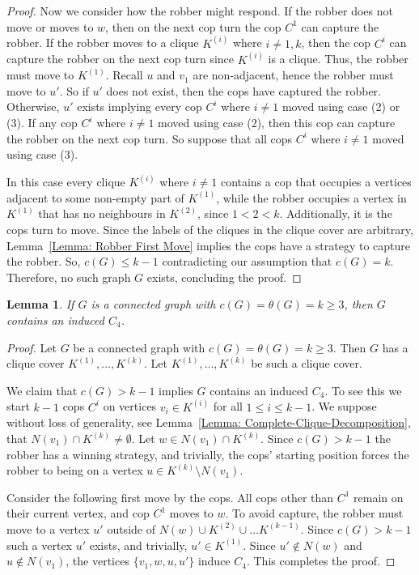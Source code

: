 \documentclass[12pt]{amsart}
\newtheorem{lemma}[theorem]{Lemma}
\theoremstyle{definition}
\begin{document}
\begin{proof}
    Now we consider how the robber might respond. If the robber does not move or moves to $w$, then on the next cop turn the cop $C^{1}$ can capture the robber.
    If the robber moves to a clique $K^{(i)}$ where $i\neq 1,k$, then the cop $C^{i}$ can capture the robber on the next cop turn since $K^{(i)}$ is a clique.
    Thus, the robber must move to $K^{(1)}$.
    Recall $u$ and $v_1$ are non-adjacent,
    hence the robber must move to $u'$.
    So if $u'$ does not exist, then the cops have captured the robber.
    Otherwise, $u'$ exists implying every cop $C^{i}$ where $i\neq 1$ moved using case (2) or (3).
    If any cop $C^{i}$ where $i\neq 1$ moved using case (2), then this cop can capture the robber on the next cop turn.
    So suppose that all cops $C^{i}$ where $i\neq 1$ moved using case (3).

    In this case every clique $K^{(i)}$ where $i\neq 1$ contains a cop that occupies a vertices adjacent to some non-empty part of $K^{(1)}$, 
    while the robber occupies a vertex in $K^{(1)}$
    that has no neighbours in $K^{(2)}$, since $1 < 2< k$.
    Additionally, it is the cops turn to move.
    Since the labels of the cliques in the clique cover are arbitrary, Lemma~\ref{Lemma: Robber First Move} implies the cops have a strategy to capture the robber.
    So, $c(G) \leq k-1$ contradicting our assumption that $c(G) = k$.
    Therefore, no such graph $G$ exists, concluding the proof.
\end{proof}


\begin{lemma}\label{Lemma: There is a C4}
    If $G$ is a connected graph with $c(G) = \theta(G) = k\geq 3$, then $G$ contains an induced $C_4$.
\end{lemma}

\begin{proof}
    Let $G$ be a connected graph with $c(G) = \theta(G) = k\geq 3$. Then $G$ has a clique cover $K^{(1)}, \dots, K^{(k)}$.
    Let  $K^{(1)}, \dots, K^{(k)}$ be such a clique cover.

    We claim that $c(G) > k-1$ implies $G$ contains an induced $C_4$.
    To see this we start $k-1$ cops $C^{i}$ on vertices
    $v_i \in K^{(i)}$ for all $1\leq i \leq k-1$.
    We suppose without loss of generality, see Lemma~\ref{Lemma: Complete-Clique-Decomposition}, that $N(v_1) \cap K^{(k)} \neq \emptyset$.
    Let $w \in N(v_1) \cap K^{(k)}$.
    Since $c(G) > k-1$ the robber has a winning strategy, and trivially, the cops' starting position forces the robber to being on a vertex $u\in K^{(k)}\setminus N(v_1)$.

    Consider the following first move by the cops.
    All cops other than $C^{1}$ remain on their current vertex, and cop $C^{1}$ moves to $w$.
    To avoid capture, the robber must move to a vertex $u'$ outside of $N(w) \cup K^{(2)} \cup \dots K^{(k-1)}$.
    Since $c(G) > k-1$ such a vertex $u'$ exists, and trivially, $u' \in K^{(1)}$.
    Since $u' \notin N(w)$ and $u \notin N(v_1)$, the vertices $\{v_1,w,u,u'\}$ induce $C_4$.
    This completes the proof.
\end{proof}
\end{document}
